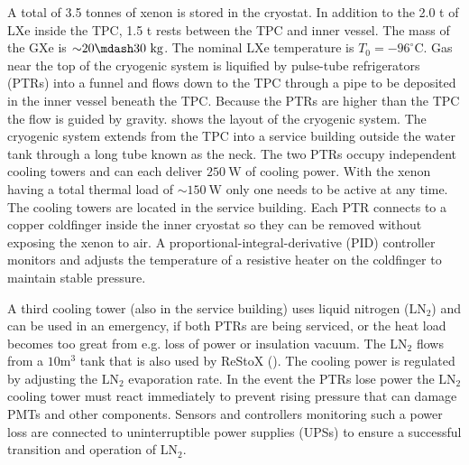 A total of 3.5 tonnes of xenon is stored in the cryostat.  In addition to the 2.0 t of LXe inside the TPC, 1.5 t rests between the
TPC and inner vessel.  The mass of the GXe is ${\sim} 20 \mdash 30\ \mathrm{kg}$.  The nominal LXe temperature is
$T_{0} = -96^{\circ} \mathrm{C}$.  Gas near the top of
the cryogenic system is liquified by pulse-tube refrigerators (PTRs) into a funnel and flows down to the TPC through a pipe to be
deposited in the inner vessel beneath the TPC.  Because
the PTRs are higher than the TPC the flow is guided by gravity.   shows the layout of the
cryogenic
system.  The cryogenic system extends from the TPC into a service building outside the water tank through a long tube known as the
neck.  The two PTRs occupy independent
cooling towers and can each deliver $250\ \mathrm{W}$ of cooling power.  With the xenon
having a total thermal load of ${\sim} 150\ \mathrm{W}$ only one needs to be active at any time.  The cooling towers
are located in the service building.  Each PTR connects to a copper coldfinger
inside the inner cryostat so they can be removed without exposing the xenon to air.  A proportional-integral-derivative (PID) controller
monitors and adjusts the temperature of a resistive heater on the coldfinger to maintain stable pressure.

A third cooling tower (also in the service building) uses liquid nitrogen ($\mathrm{LN_2}$) and can be used in an emergency, if both PTRs
are being serviced, or the
heat load becomes too great from e.g. loss of power or insulation vacuum.  The $\mathrm{LN_2}$ flows from a $10 \mathrm{m^3}$ tank that
is also used by ReStoX ().  The cooling power is regulated by adjusting the $\mathrm{LN_2}$ evaporation
rate.  In the event the PTRs
lose power the $\mathrm{LN_2}$ cooling tower must react immediately to prevent rising pressure that can damage PMTs and other
components.  Sensors and controllers monitoring such a power loss are connected to uninterruptible power supplies (UPSs) to ensure a
successful transition and operation of $\mathrm{LN_2}$.

